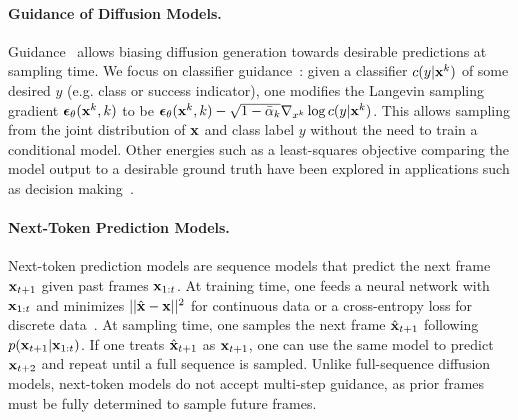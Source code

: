 \paragraph{Guidance of Diffusion Models.}
Guidance~\cite{ho2022classifierfree,dhariwal2021diffusion} allows biasing diffusion generation towards desirable predictions at sampling time. 
We focus on classifier guidance~\cite{dhariwal2021diffusion}: given a classifier $c(y|\mathbf{x}^k)$ of some desired $y$ (e.g. class or success indicator), one modifies the Langevin sampling ~\cite{ddpm} gradient $\bm{\epsilon}_\theta(\mathbf{x}^k, k)$ to be $\bm{\epsilon}_\theta(\mathbf{x}^k, k)-\sqrt{1-\bar{\alpha}_k}\nabla_{x^k}\log c(y|\mathbf{x}^k)$. This allows sampling from the joint distribution of $\mathbf{x}$ and class label $y$ without the need to train a conditional model. Other energies such as a least-squares objective comparing the model output to a desirable ground truth have been explored in applications such as decision making~\cite{dhariwal2021diffusion,janner2022planning}.

\paragraph{Next-Token Prediction Models.}
Next-token prediction models are sequence models that predict the next frame $\mathbf{x}_{t+1}$ given past frames $\mathbf{x}_{1:t}$. At training time, one feeds a neural network with $\mathbf{x}_{1:t}$ and minimizes $||\hat{\mathbf{x}}-\mathbf{x}||^2$ for continuous data or a cross-entropy loss for discrete data~\cite{teacher_forcing}. At sampling time, one samples the next frame $\hat{\mathbf{x}}_{t+1}$ following $p(\mathbf{x}_{t+1}|\mathbf{x}_{1:t})$. If one treats $\hat{\mathbf{x}}_{t+1}$ as $\mathbf{x}_{t+1}$, one can use the same model to predict $\mathbf{x}_{t+2}$ and repeat until a full sequence is sampled. Unlike full-sequence diffusion models, next-token models do not accept multi-step guidance, as prior frames must be fully determined to sample future frames. 

